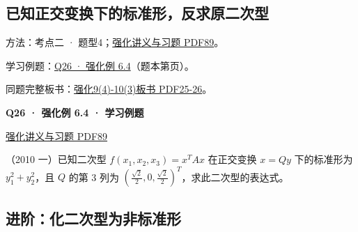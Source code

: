\documentclass[UTF8,fontset=fandol,11pt,a4paper]{ctexart}
\newcommand{\source}[1]{{\footnotesize\color{Muted}#1\par}}
\newcommand{\qtitle}[2]{\par\needspace{5\baselineskip}\hypertarget{#1}{}\label{#1}\textbf{#2}\par}
\begin{document}
\subsection*{已知正交变换下的标准形，反求原二次型}
\hypertarget{node-A3}{}
方法：考点二 · 题型4；\href{file:///Users/skyintelligence/Desktop/\%E5\%BE\%97\%E8\%AF\%BB\%E4\%B8\%AA\%E7\%A0\%94-\%E5\%8C\%97\%E5\%A4\%A7\%E8\%BD\%AF\%E5\%BE\%AE/\%E6\%95\%B0\%E5\%AD\%A6\%20150/Kira\%C2\%B727\%E7\%BA\%BF\%E6\%80\%A7\%E4\%BB\%A3\%E6\%95\%B0\%E5\%BC\%BA\%E5\%8C\%96\%E8\%AE\%B2\%E4\%B9\%89\%2B\%E4\%B9\%A0\%E9\%A2\%98.pdf\#page=89}{强化讲义与习题 PDF89}。\par
学习例题：\hyperlink{R-EX-04}{Q26 · 强化例 6.4}（题本第\pageref*{R-EX-04}页）。\par
同题完整板书：\href{file:///Users/skyintelligence/Desktop/\%E5\%BE\%97\%E8\%AF\%BB\%E4\%B8\%AA\%E7\%A0\%94-\%E5\%8C\%97\%E5\%A4\%A7\%E8\%BD\%AF\%E5\%BE\%AE/\%E6\%95\%B0\%E5\%AD\%A6\%20150/\%E7\%BA\%BF\%E6\%80\%A7\%E4\%BB\%A3\%E6\%95\%B0/\%E7\%BA\%BF\%E4\%BB\%A3\%E5\%BC\%BA\%E5\%8C\%969\%284\%29-10\%283\%29\%20\%20\%E7\%AC\%AC\%E4\%BA\%94\%E5\%85\%AD\%E7\%AB\%A0\%20\%E5\%AE\%9E\%E5\%AF\%B9\%E7\%A7\%B0\%E7\%9F\%A9\%E9\%98\%B5\%26\%E4\%BA\%8C\%E6\%AC\%A1\%E5\%9E\%8B1\%E3\%80\%90\%E4\%BE\%8B5.6\%E3\%80\%91-\%E3\%80\%90\%E4\%BE\%8B6.4\%E3\%80\%91.pdf\#page=25}{强化9(4)-10(3)板书 PDF25-26}。\par
\vspace{3mm}
\begin{minipage}{\linewidth}
\qtitle{R-EX-04}{Q26 · 强化例 6.4 · 学习例题}
\source{\href{file:///Users/skyintelligence/Desktop/\%E5\%BE\%97\%E8\%AF\%BB\%E4\%B8\%AA\%E7\%A0\%94-\%E5\%8C\%97\%E5\%A4\%A7\%E8\%BD\%AF\%E5\%BE\%AE/\%E6\%95\%B0\%E5\%AD\%A6\%20150/Kira\%C2\%B727\%E7\%BA\%BF\%E6\%80\%A7\%E4\%BB\%A3\%E6\%95\%B0\%E5\%BC\%BA\%E5\%8C\%96\%E8\%AE\%B2\%E4\%B9\%89\%2B\%E4\%B9\%A0\%E9\%A2\%98.pdf\#page=89}{强化讲义与习题 PDF89}}
（2010 一）已知二次型 $f(x_1,x_2,x_3)=x^TAx$ 在正交变换 $x=Qy$ 下的标准形为 $y_1^2+y_2^2$，且 $Q$ 的第 3 列为 $\left(\frac{\sqrt2}{2},0,\frac{\sqrt2}{2}\right)^T$，求此二次型的表达式。
\end{minipage}\par\vspace{7mm}
\clearpage
\subsection*{进阶：化二次型为非标准形}
\end{document}
